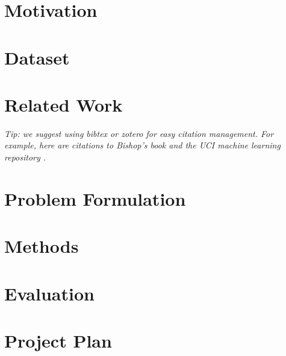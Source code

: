 \documentclass[english]{article}
\begin{document}

\section{Motivation}

\section{Dataset}

\section{Related Work}

\textit{Tip: we suggest using bibtex or zotero for easy citation management. For example, here are citations to Bishop's book \cite{Bishop06} and the UCI machine learning repository \cite{DuaKa17}.}

\section{Problem Formulation}

\section{Methods}

\section{Evaluation}

\section{Project Plan}






\end{document}
